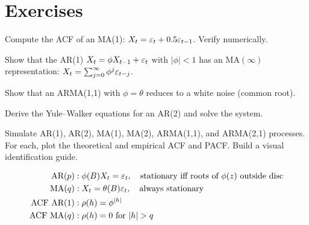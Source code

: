 \section{Exercises}

\begin{exercise}[$\star$]
Compute the ACF of an MA(1): $X_t = \varepsilon_t+0.5\varepsilon_{t-1}$. Verify numerically.
\end{exercise}

\begin{exercise}[$\star\star$]
Show that the AR(1) $X_t = \phi X_{t-1}+\varepsilon_t$ with $|\phi|<1$ has an MA$(\infty)$ representation: $X_t = \sum_{j=0}^{\infty}\phi^j\varepsilon_{t-j}$.
\end{exercise}

\begin{exercise}[$\star\star$]
Show that an ARMA(1,1) with $\phi=\theta$ reduces to a white noise (common root).
\end{exercise}

\begin{exercise}[$\star\star$]
Derive the Yule--Walker equations for an AR(2) and solve the system.
\end{exercise}

\begin{exercise}
Simulate AR(1), AR(2), MA(1), MA(2), ARMA(1,1), and ARMA(2,1) processes. For each, plot the theoretical and empirical ACF and PACF. Build a visual identification guide.
\end{exercise}

\begin{keyformulas}
\begin{align*}
\text{AR}(p) &: \phi(B)X_t=\eps_t, \quad \text{stationary iff roots of }\phi(z)\text{ outside disc} \\
\text{MA}(q) &: X_t=\theta(B)\eps_t, \quad \text{always stationary} \\
\text{ACF AR}(1) &: \rho(h)=\phi^{|h|} \\
\text{ACF MA}(q) &: \rho(h)=0\text{ for }|h|>q
\end{align*}
\end{keyformulas}
